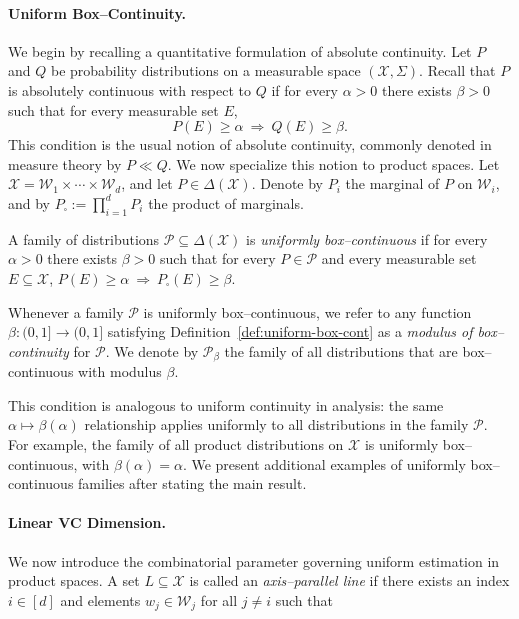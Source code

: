 \documentclass[arxiv]{colt2026}
\newcommand{\X}{\mathcal{X}}
\newcommand{\W}{\mathcal{W}}
\newcommand{\Pc}{\mathcal{P}}
\begin{document}
\paragraph{Uniform Box--Continuity.}
We begin by recalling a quantitative formulation of absolute continuity.
Let $P$ and $Q$ be probability distributions on a measurable space $(\X,\Sigma)$.
Recall that $P$ is absolutely continuous with respect to $Q$ if for every
$\alpha>0$ there exists $\beta>0$ such that for every measurable set $E$,
\[
P(E)\ge \alpha \ \Longrightarrow\ Q(E)\ge \beta .
\]
This condition is the usual notion of absolute continuity, commonly denoted in
measure theory by $P\ll Q$. 
We now specialize this notion to product spaces.
Let $\X = \W_1 \times \cdots \times \W_d$, and let $P \in \Delta(\X)$.
Denote by $P_i$ the marginal of $P$ on $\W_i$, and by
$P_{\square} := \prod_{i=1}^d P_i$ the product of marginals.
\vspace{-0.5em}
\begin{definition}
\label{def:uniform-box-cont}
A family of distributions $\Pc \subseteq \Delta(\X)$ is \emph{uniformly box--continuous}
if for every $\alpha>0$ there exists $\beta >0$ such that for every $P \in \Pc$ and every measurable set $E \subseteq \X$, \(P(E) \ge \alpha
\ \Longrightarrow\
P_{\square}(E) \ge \beta\).
\end{definition}
\vspace{-0.3em}
Whenever a family $\Pc$ is uniformly box--continuous, we refer to any function
$\beta \colon (0,1] \to (0,1]$ satisfying Definition~\ref{def:uniform-box-cont}
as a \emph{modulus of box--continuity} for $\Pc$. 
We denote by $\Pc_{\beta}$ the family of all distributions that are box--continuous
with modulus $\beta$.

This condition is analogous to uniform continuity in analysis: the same
$\alpha \mapsto \beta(\alpha)$ relationship applies uniformly to all distributions
in the family $\Pc$.
For example, the family of all product distributions on $\X$ is uniformly box--continuous,
with $\beta(\alpha) = \alpha$.
We present additional examples of uniformly box--continuous families after stating the main result.

\paragraph{Linear VC Dimension.}
We now introduce the combinatorial parameter governing uniform estimation in product spaces.
A set $L \subseteq \X$ is called an \emph{axis--parallel line} if there exists an
index $i \in [d]$ and elements $w_j \in \W_j$ for all $j \neq i$ such that
\end{document}
